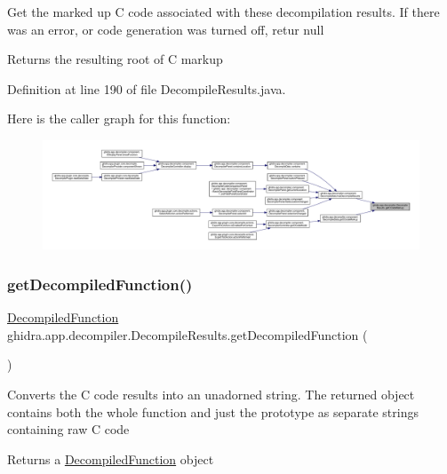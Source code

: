 Get the marked up C code associated with these decompilation results. If there was an error, or code generation was turned off, retur null \begin{DoxyReturn}{Returns}
the resulting root of C markup 
\end{DoxyReturn}


Definition at line 190 of file Decompile\+Results.\+java.

Here is the caller graph for this function\+:
\nopagebreak
\begin{figure}[H]
\begin{center}
\leavevmode
\includegraphics[width=350pt]{classghidra_1_1app_1_1decompiler_1_1_decompile_results_a1ca085b179f273b38e002f2b2f24cb5d_icgraph}
\end{center}
\end{figure}
\mbox{\label{classghidra_1_1app_1_1decompiler_1_1_decompile_results_a2cc778a7c03ea4f665d380fd91891e1f}} 
\subsubsection{\texorpdfstring{getDecompiledFunction()}{getDecompiledFunction()}}
{\footnotesize\ttfamily \mbox{\hyperlink{classghidra_1_1app_1_1decompiler_1_1_decompiled_function}{Decompiled\+Function}} ghidra.\+app.\+decompiler.\+Decompile\+Results.\+get\+Decompiled\+Function (\begin{DoxyParamCaption}{ }\end{DoxyParamCaption})\hspace{0.3cm}{\ttfamily [inline]}}

Converts the C code results into an unadorned string. The returned object contains both the whole function and just the prototype as separate strings containing raw C code \begin{DoxyReturn}{Returns}
a \mbox{\hyperlink{classghidra_1_1app_1_1decompiler_1_1_decompiled_function}{Decompiled\+Function}} object 
\end{DoxyReturn}


